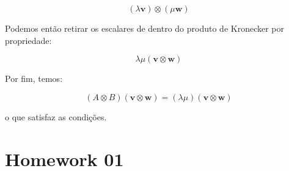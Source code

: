 	\begin{equation}
		(\lambda \mathbf{v}) \otimes (\mu \mathbf{w})
	\end{equation}
	
	Podemos então retirar os escalares de dentro do produto de Kronecker por propriedade:
	
	\begin{equation}
		\lambda\mu (\mathbf{v} \otimes \mathbf{w})
	\end{equation}
	
	Por fim, temos: 
	
	\begin{equation}
		(A \otimes B)(\mathbf{v} \otimes \mathbf{w}) = (\lambda\mu)(\mathbf{v} \otimes \mathbf{w})
	\end{equation}
	
	o que satisfaz as condições. 
	
	\section{Homework 01}
	
	
	
	
	


